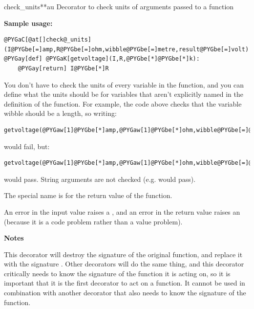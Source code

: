 \documentclass[letterpaper,10pt,english]{manual}
\begin{document}
\hypertarget{brian.check_units}{}\begin{funcdesc}{check\_units}{**au}
Decorator to check units of arguments passed to a function

\textbf{Sample usage:}

\begin{Verbatim}[commandchars=@\[\]]
@PYGaC[@at[]check@_units](I@PYGbe[=]amp,R@PYGbe[=]ohm,wibble@PYGbe[=]metre,result@PYGbe[=]volt)
@PYGay[def] @PYGaK[getvoltage](I,R,@PYGbe[*]@PYGbe[*]k):
    @PYGay[return] I@PYGbe[*]R
\end{Verbatim}

You don't have to check the units of every variable in the function, and
you can define what the units should be for variables that aren't
explicitly named in the definition of the function. For example, the code
above checks that the variable wibble should be a length, so writing:

\begin{Verbatim}[commandchars=@\[\]]
getvoltage(@PYGaw[1]@PYGbe[*]amp,@PYGaw[1]@PYGbe[*]ohm,wibble@PYGbe[=]@PYGaw[1])
\end{Verbatim}

would fail, but:

\begin{Verbatim}[commandchars=@\[\]]
getvoltage(@PYGaw[1]@PYGbe[*]amp,@PYGaw[1]@PYGbe[*]ohm,wibble@PYGbe[=]@PYGaw[1]@PYGbe[*]metre)
\end{Verbatim}

would pass.
String arguments are not checked (e.g.  would pass).

The special name  is for the return value of the function.

An error in the input value raises a \hyperlink{brian.DimensionMismatchError}{}, and an error
in the return value raises an  (because it is a code
problem rather than a value problem).

\textbf{Notes}

This decorator will destroy the signature of the original function, and
replace it with the signature . Other decorators will
do the same thing, and this decorator critically needs to know the signature
of the function it is acting on, so it is important that it is the first
decorator to act on a function. It cannot be used in combination with another
decorator that also needs to know the signature of the function.
\end{funcdesc}
\end{document}
